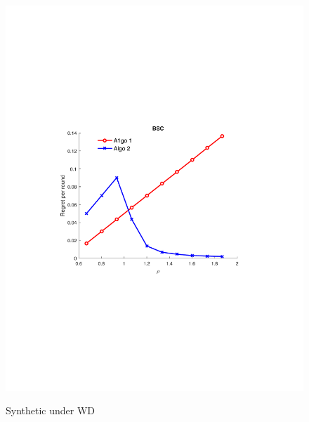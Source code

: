 \begin{figure}[!bt]
\begin{minipage}{4.3cm}
		\includegraphics[scale=0.3]{../Simulations/Figures/BSC_WD1}
		\label{fig:BSC_WD}
		\vspace{-.3cm}
		\caption{\small Synthetic under WD}
	\end{minipage}
	\begin{minipage}{4cm}
		\centering

\end{minipage}
\end{figure}
